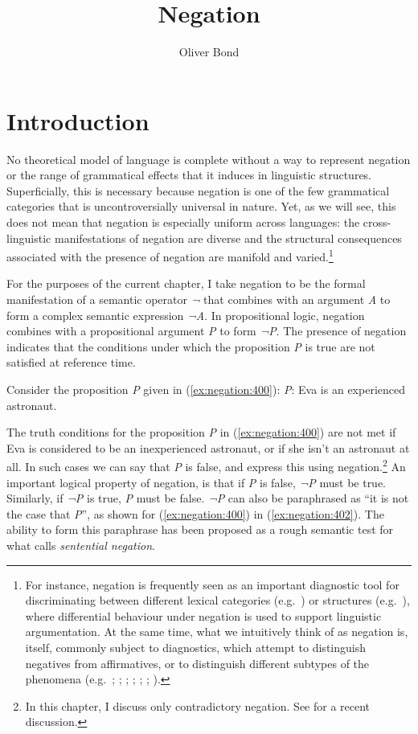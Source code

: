\documentclass[output=paper,hidelinks]{langscibook}
\title{Negation}
\author{Oliver Bond\affiliation{University of Surrey}}
\begin{document}
\maketitle
\label{chap:Negation}

\section{Introduction} 

No theoretical model of language is complete without a way to represent negation or the range of grammatical effects that it induces in linguistic structures. Superficially, this is necessary because negation is one of the few grammatical categories that is uncontroversially universal in nature. Yet, as we will see, this does not mean that negation is especially uniform across languages: the cross-linguistic manifestations of negation are diverse and the structural consequences associated with the presence of negation are manifold and varied.\footnote{For instance, negation is frequently seen as an important diagnostic tool for discriminating between different lexical categories (e.g.\ \citealt {Stassen1997}) or structures (e.g.\ \citealt {Brown:Sells:16}), where differential behaviour under negation is used to support linguistic argumentation. At the same time, what we intuitively think of as negation is, itself, commonly subject to diagnostics, which attempt to distinguish negatives from affirmatives, or to distinguish different subtypes of the phenomena (e.g.\ \citealt {Jespersen:17}; \citealt{Klima:64}; \citealt{Jackendoff:69}; \citealt{deHaan:97}; \citealt  {Zanuttini:01}; \citealt{Giannakidou:06}; \citealt{przepiorkowski2015two}).} 

For the purposes of the current chapter, I take negation to be the formal manifestation of a semantic operator \emph{¬} that combines with an argument \emph{A} to form a complex semantic expression \emph{¬A}. In propositional logic, negation combines with a propositional argument \emph{P} to form \emph{¬P}. The presence of negation indicates that the conditions under which the proposition \emph{P} is true are not satisfied at reference time.

Consider the proposition \emph{P} given in (\ref{ex:negation:400}):
\ea
\label{ex:negation:400}
\emph{P}: Eva is an experienced astronaut.\\
\z

The truth conditions for the proposition \emph{P} in (\ref{ex:negation:400}) are not met if Eva is considered to be an inexperienced astronaut, or if she isn't an astronaut at all. In such cases we can say that \emph{P} is false, and express this using negation.\footnote{In this chapter, I discuss only contradictory negation. See \citet {Horn:20} for a recent discussion.} An important logical property of negation, is that if \emph{P} is false, \emph{¬P} must be true. Similarly, if \emph{¬P} is true, \emph{P} must be false. \emph{¬P} can also be paraphrased as “it is not the case that \emph{P}”, as shown for (\ref{ex:negation:400}) in (\ref{ex:negation:402}). The ability to form this paraphrase has been proposed as a rough semantic test for what \citet {Jackendoff:69} calls \emph{sentential negation}.
\end{document}
